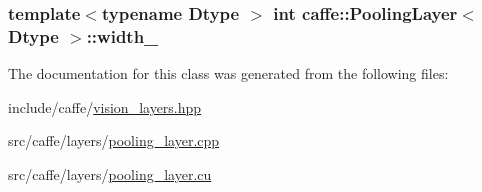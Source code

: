 \hypertarget{classcaffe_1_1_pooling_layer_a812efd53d8f67f250beeb7c79cc74cbe}{
\subsubsection[{width\+\_\+}]{\setlength{\rightskip}{0pt plus 5cm}template$<$typename Dtype $>$ int {\bf caffe\+::\+Pooling\+Layer}$<$ Dtype $>$\+::width\+\_\+\hspace{0.3cm}{\ttfamily [protected]}}}\label{classcaffe_1_1_pooling_layer_a812efd53d8f67f250beeb7c79cc74cbe}


The documentation for this class was generated from the following files\+:\begin{DoxyCompactItemize}
\item 
include/caffe/\hyperlink{vision__layers_8hpp}{vision\+\_\+layers.\+hpp}\item 
src/caffe/layers/\hyperlink{pooling__layer_8cpp}{pooling\+\_\+layer.\+cpp}\item 
src/caffe/layers/\hyperlink{pooling__layer_8cu}{pooling\+\_\+layer.\+cu}\end{DoxyCompactItemize}
